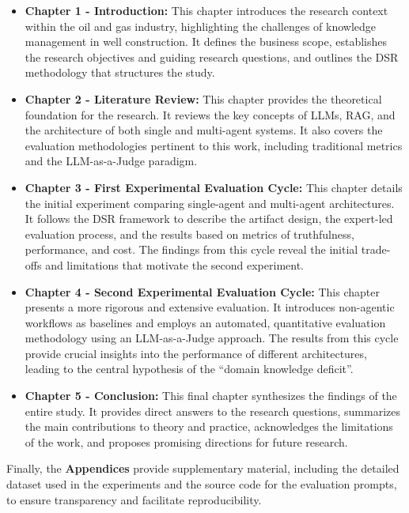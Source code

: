     \begin{itemize}
        \item \textbf{Chapter 1 - Introduction:} This chapter introduces the research context within the oil and gas industry, highlighting the challenges of knowledge management in well construction. It defines the business scope, establishes the research objectives and guiding research questions, and outlines the DSR methodology that structures the study.

        \item \textbf{Chapter 2 - Literature Review:} This chapter provides the theoretical foundation for the research. It reviews the key concepts of LLMs, RAG, and the architecture of both single and multi-agent systems. It also covers the evaluation methodologies pertinent to this work, including traditional metrics and the LLM-as-a-Judge paradigm.

        \item \textbf{Chapter 3 - First Experimental Evaluation Cycle:} This chapter details the initial experiment comparing single-agent and multi-agent architectures. It follows the DSR framework to describe the artifact design, the expert-led evaluation process, and the results based on metrics of truthfulness, performance, and cost. The findings from this cycle reveal the initial trade-offs and limitations that motivate the second experiment.

        \item \textbf{Chapter 4 - Second Experimental Evaluation Cycle:} This chapter presents a more rigorous and extensive evaluation. It introduces non-agentic workflows as baselines and employs an automated, quantitative evaluation methodology using an LLM-as-a-Judge approach. The results from this cycle provide crucial insights into the performance of different architectures, leading to the central hypothesis of the ``domain knowledge deficit''.

        \item \textbf{Chapter 5 - Conclusion:} This final chapter synthesizes the findings of the entire study. It provides direct answers to the research questions, summarizes the main contributions to theory and practice, acknowledges the limitations of the work, and proposes promising directions for future research.
    \end{itemize}

    Finally, the \textbf{Appendices} provide supplementary material, including the detailed dataset used in the experiments and the source code for the evaluation prompts, to ensure transparency and facilitate reproducibility.
